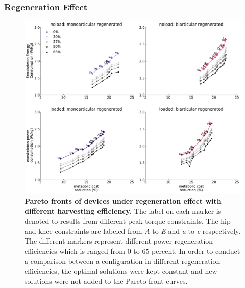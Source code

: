 \documentclass[10pt,letterpaper]{article}
\begin{document}
\subsubsection*{Regeneration Effect}
\begin{figure}[t!]   
	\centering
	\includegraphics[width=\linewidth]{Pareto_Mass_Regenration_Figures/PaperFigure_Paretofront_Regeneration_Efficiency.pdf}
	\vspace{1mm}
	\caption{{\small\textbf{Pareto fronts of devices under regeneration effect with different harvesting efficiency.} The label on each marker is denoted to results from different peak torque constraints. The hip and knee constraints are labeled from {\it A} to {\it E} and {\it a} to {\it e} respectively. The different markers represent different power regeneration efficiencies which is ranged from 0 to 65 percent. In order to conduct a comparison between a configuration in different regeneration efficiencies, the optimal solutions were kept constant and new solutions were not added to the Pareto front curves. }}
	\label{Fig_Paretofronts_Regeneration_Efficiency_Comparison}
\end{figure}
\end{document}
